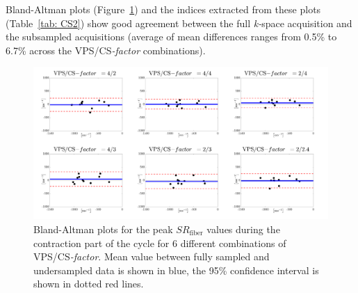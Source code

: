 Bland-Altman plots (Figure~\ref{fig: CS10}) and the indices extracted from these plots (Table~\ref{tab: CS2}) show good agreement between the full \mbox{\textit{k-}space} acquisition and the subsampled acquisitions (average of mean differences ranges from 0.5\% to 6.7\% across the VPS/\mbox{CS\textit{-factor}} combinations).
\begin{figure}[!htb]
\vspace{+0.2cm}
\centering
\includegraphics[width=\textwidth]{Figures/CS1_15.pdf}
\caption[Bland-Altman plots for the peak $SR_\mathrm{fiber}$ values during the contraction part of the cycle for 6 different combinations of VPS/\mbox{CS\textit{-factor}}]{Bland-Altman plots for the peak $SR_\mathrm{fiber}$ values during the contraction part of the cycle for 6 different combinations of VPS/\mbox{CS\textit{-factor}}. Mean value between fully sampled and undersampled data is shown in blue, the 95\% confidence interval is shown in dotted red lines.}
\label{fig: CS10}
\end{figure}
